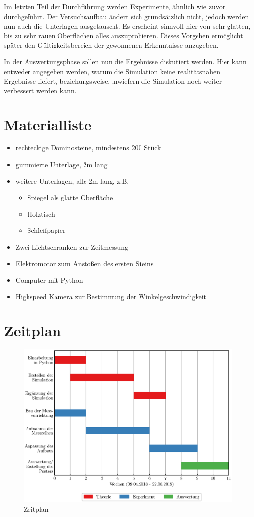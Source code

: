 \documentclass[11pt,a4paper]{scrartcl}
\begin{document}
Im letzten Teil der Durchführung werden Experimente, ähnlich wie zuvor, durchgeführt. Der Versuchsaufbau ändert sich grundsätzlich nicht, jedoch werden nun auch die Unterlagen ausgetauscht. Es erscheint sinnvoll hier von sehr glatten, bis zu sehr rauen Oberflächen alles auszuprobieren. Dieses Vorgehen ermöglicht später den Gültigkeitsbereich der gewonnenen Erkenntnisse anzugeben.

In der Auswertungsphase sollen nun die Ergebnisse diskutiert werden. Hier kann entweder angegeben werden, warum die Simulation keine realitätsnahen Ergebnisse liefert, beziehungsweise, inwiefern die Simulation noch weiter verbessert werden kann.


\section{Materialliste}
\begin{itemize}
	\item rechteckige Dominosteine, mindestens 200 Stück
	\item gummierte Unterlage, 2m lang
	\item weitere Unterlagen, alle 2m lang, z.B.
	\begin{itemize}
		\item Spiegel als glatte Oberfläche
		\item Holztisch
		\item Schleifpapier
	\end{itemize}
	\item Zwei Lichtschranken zur Zeitmessung
	\item Elektromotor zum Anstoßen des ersten Steins
	\item Computer mit Python
	\item Highspeed Kamera zur Bestimmung der Winkelgeschwindigkeit \\
\end{itemize}


\section{Zeitplan}
\begin{figure}[h!]
    \centering
    \includegraphics[width=\textwidth]{timetable.eps}
    \caption{Zeitplan}
    \label{abb:2}
\end{figure}
\end{document}
